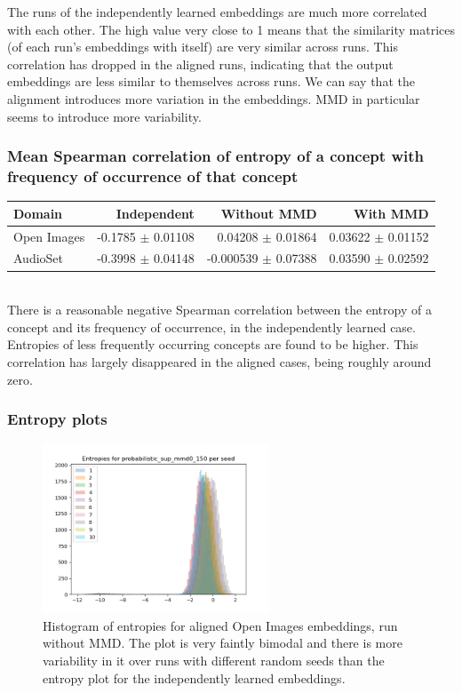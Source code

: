 The runs of the independently learned embeddings are much more correlated with each other. The high value very close to 1 means that the similarity matrices (of each run's embeddings with itself) are very similar across runs. This correlation has dropped in the aligned runs, indicating that the output embeddings are less similar to themselves across runs. We can say that the alignment introduces more variation in the embeddings. MMD in particular seems to introduce more variability. 


\subsubsection{Mean Spearman correlation of entropy of a concept with frequency of occurrence of that concept}
\begin{tabular}{lrrr}
\toprule
Domain &   Independent & Without MMD &  With MMD \\
\midrule
Open Images    &  -0.1785 $\pm$ 0.01108 & 0.04208 $\pm$ 0.01864 &     0.03622 $\pm$  0.01152 \\
AudioSet    &  -0.3998 $\pm$ 0.04148 & -0.000539 $\pm$   0.07388 &      0.03590  $\pm$ 0.02592  \\
\bottomrule
\end{tabular}\\

There is a reasonable negative Spearman correlation between the entropy of a concept and its frequency of occurrence, in the independently learned case. Entropies of less frequently occurring concepts are found to be higher. This correlation has largely disappeared in the aligned cases, being roughly around zero. 

\newpage
\subsubsection{Entropy plots}

\begin{figure}[H]
    \centering
    \includegraphics[width=0.6\textwidth]{images/method/probabilistic_aligned/openimages/probabilistic_sup_mmd0_150_entropies.png}
    \caption{
        Histogram of entropies for aligned Open Images embeddings, run without MMD. The plot is very faintly bimodal and there is more variability in it over runs with different random seeds than the entropy plot for the independently learned embeddings. 
    }
\end{figure}

